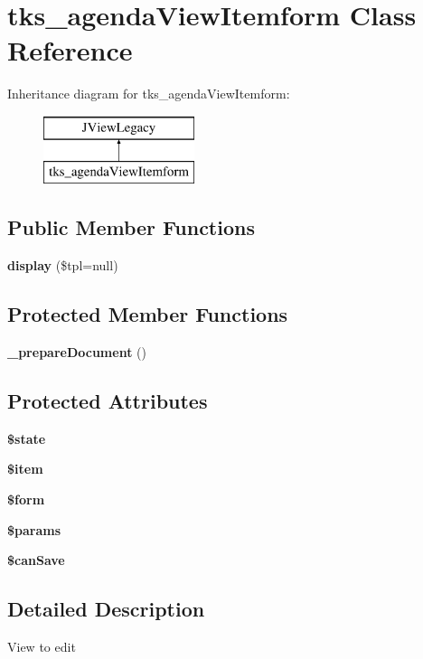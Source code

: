 \section{tks\+\_\+agenda\+View\+Itemform Class Reference}
\label{classtks__agenda_view_itemform}
Inheritance diagram for tks\+\_\+agenda\+View\+Itemform\+:\begin{figure}[H]
\begin{center}
\leavevmode
\includegraphics[height=2.000000cm]{classtks__agenda_view_itemform}
\end{center}
\end{figure}
\subsection*{Public Member Functions}
\begin{DoxyCompactItemize}
\item 
\textbf{ display} (\$tpl=null)
\end{DoxyCompactItemize}
\subsection*{Protected Member Functions}
\begin{DoxyCompactItemize}
\item 
\textbf{ \+\_\+prepare\+Document} ()
\end{DoxyCompactItemize}
\subsection*{Protected Attributes}
\begin{DoxyCompactItemize}
\item 
\textbf{ \$state}
\item 
\textbf{ \$item}
\item 
\textbf{ \$form}
\item 
\textbf{ \$params}
\item 
\textbf{ \$can\+Save}
\end{DoxyCompactItemize}


\subsection{Detailed Description}
View to edit

